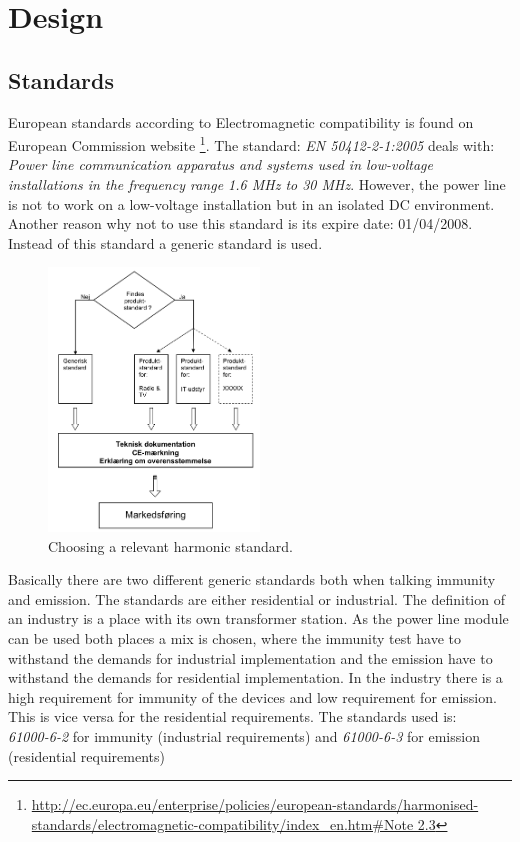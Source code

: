 \chapter{Design}
\section{Standards}
European standards according to Electromagnetic compatibility is found on European Commission website \footnote{\url{http://ec.europa.eu/enterprise/policies/european-standards/harmonised-standards/electromagnetic-compatibility/index\_en.htm\#Note 2.3}}.
The standard: \textit{EN 50412-2-1:2005} deals with: \textit{Power line communication apparatus and systems used in low-voltage installations in the frequency range 1.6 MHz to 30 MHz}. However, the power line is not to work on a low-voltage installation but in an isolated DC environment. Another reason why not to use this standard is its expire date: 01/04/2008. Instead of this standard a generic standard is used.

\begin{figure}[H]
	\begin{centering}
		 \includegraphics[width=0.5\textwidth]{images/choose_hormonic_standard.png}
		\caption{Choosing a relevant harmonic standard.}
	\end{centering}
\end{figure}
Basically there are two different generic standards both when talking immunity and emission. The standards are either residential or industrial. The definition of an industry is a place with its own transformer station. As the power line module can be used both places a mix is chosen, where the immunity test have to withstand the demands for industrial implementation and the emission have to withstand the demands for residential implementation. In the industry there is a high requirement for immunity of the devices and low requirement for emission. This is vice versa for the residential requirements. The standards used is:
\\\textit{61000-6-2} for immunity (industrial requirements) and \textit{61000-6-3} for emission (residential requirements)

